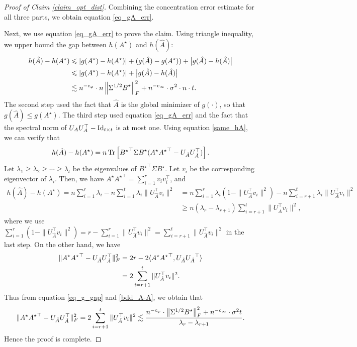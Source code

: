 \begin{proof}[Proof of Claim \ref{claim_opt_dist}]
	Combining the concentration error estimate for all three parts, we obtain equation \eqref{eq_gA_err}.

	\medskip
	Next, we use equation \eqref{eq_gA_err} to prove the claim.
	Using triangle inequality, we upper bound the gap between $h(A^{\star})$ and $h(\hat{A})$:  
	\begin{align}
		h(\hat{A})- h(A^{\star})   &\leqslant {\left| {g(A^{\star}) - h(A^{\star})} \right|} + (g(\hat A) - g({A}^{\star})) + \big|g(\hat{A}) - h(\hat{A})\big| \nonumber \\
		&\leqslant {\left| {g(A^{\star}) - h(A^{\star})} \right|}  + \big|g(\hat{A}) - h(\hat{A})\big|\nonumber \\
		&\lesssim n^{-c_\varphi}\cdot n \left\| \Sigma^{1/2} B^{\star} \right\|_{F}^2 + n^{-c_\infty}\cdot \sigma^2 \cdot n \cdot t. \label{eq_g_gap}
	\end{align}
	The second step used the fact that $\hat A$ is the global minimizer of $g(\cdot)$, so that $g(\hat A) \le g({A}^\star)$.
	The third step used equation \eqref{eq_gA_err} and the fact that the spectral norm of $U_A U_A^{\top} - \operatorname{Id}_{t\times t}$ is at most one. 
	Using equation \eqref{same_hA}, we can verify that
	$$h(\hat A)-h(A^\star) = n \operatorname{Tr}\left[{B^\star}^\top\Sigma B^\star ( A^\star {A^\star}^\top -U_{\hat A}U^\top_{\hat A})\right] .$$
	Let $\lambda_1\ge\lambda_2 \ge \cdots\ge \lambda_t$ be the eigenvalues of ${B^\star}^\top\Sigma B^\star$.
	Let $v_i$ be the corresponding eigenvector of $\lambda_i$.
	Then, we have $A^\star {A^\star}^\top =\sum_{i=1}^r v_i v_i^\top$, and
	\begin{align}
	h(\hat A)-h(A^\star) = n \sum_{i=1}^r \lambda_i - n\sum_{i=1}^t \lambda_i \| U^\top_{\hat A} v_i\|^2 &= n\sum_{i=1}^r \lambda_i\left(1 -  \| U^\top_{\hat A} v_i\|^2\right)-n\sum_{i=r+1}^t \lambda_i \| U^\top_{\hat A} v_i\|^2 \nonumber\\
	&\ge  n(\lambda_r-\lambda_{r+1}) \sum_{i=r+1}^t \| U^\top_{\hat A} v_i\|^2 , \label{bdd_A-A}
	\end{align}
	where we use $\sum_{i=1}^r \left(1 -  \| U^\top_{\hat A} v_i\|^2\right) = r- \sum_{i=1}^r  \| U^\top_{\hat A} v_i\|^2 =\sum_{i=r+1}^t \| U^\top_{\hat A} v_i\|^2  $ in the last step.
	On the other hand, we have
	\begin{align*}
	\| A^\star {A^\star}^\top -U_{\hat A}U^\top_{\hat A}\|_F^2
	&= 2r - 2\langle A^{\star}{A^{\star}}^{\top}, U_{\hat{A}} {U_{\hat{A}}}^{\top} \rangle \\
	&= 2 \sum_{i=r+1}^t \| U^\top_{\hat A} v_i\|^2.
	\end{align*}
	Thus from equation \eqref{eq_g_gap} and  \eqref{bdd_A-A}, we obtain that
	$$\| A^\star {A^\star}^\top -U_{\hat A}U^\top_{\hat A}\|_F^2  =2 \sum_{i=r+1}^t \| U^\top_{\hat A} v_i\|^2 \lesssim \frac{n^{-c_\varphi}\cdot  \left\| \Sigma^{1/2} B^{\star} \right\|_{F}^2 + n^{-c_\infty}\cdot \sigma^2 t}{\lambda_r- \lambda_{r+1}}  .$$
	Hence the proof is complete.
	\end{proof}
	
